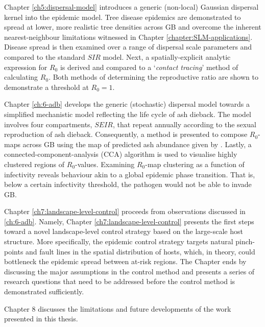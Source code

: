 Chapter \ref{ch5:dispersal-model} introduces a generic (non-local) Gaussian dispersal kernel into the epidemic model. 
Tree disease epidemics are demonstrated to spread at lower, more realistic tree densities across GB and overcome the inherent nearest-neighbour limitations witnessed in Chapter \ref{chapter:SLM-applications}. Disease spread is then examined over a range of dispersal scale parameters and compared to the standard $SIR$ model.
Next, a spatially-explicit analytic expression for $R_0$ is derived and compared to a `\textit{contact tracing}' method of calculating $R_0$.
Both methods of determining the reproductive ratio are shown to demonstrate a threshold at $R_0=1$.

Chapter \ref{ch:6-adb} develops the generic (stochastic) dispersal model towards a simplified mechanistic
model reflecting the life cycle of ash dieback. The model involves four compartments, $SEIR$, that repeat
annually according to the sexual reproduction of ash dieback. Consequently, a method is presented to compose $R_0$-maps
across GB using the map of predicted ash abundance given by \cite{hill.data}. Lastly, a connected-component-analysis
(CCA) algorithm is used to visualise highly clustered regions of $R_0$-values. Examining $R_0$-map clustering as a function
of infectivity reveals behaviour akin to a global epidemic phase transition. That is, below a certain infectivity threshold, 
the pathogen would not be able to invade GB.

Chapter \ref{ch7:landscape-level-control} proceeds from observations discussed in \ref{ch:6-adb}. 
Namely, Chapter \ref{ch7:landscape-level-control} presents the first steps toward a novel landscape-level
control strategy based on the large-scale host structure. More specifically, the epidemic control strategy targets
natural pinch-points and fault lines in the spatial distribution of hosts, which, in theory, could bottleneck the epidemic
spread between at-risk regions. The Chapter ends by discussing the major assumptions in the control method and presents
a series of research questions that need to be addressed before the control method is demonstrated sufficiently.

Chapter 8 discusses the limitations and future developments of the work presented in this thesis.
